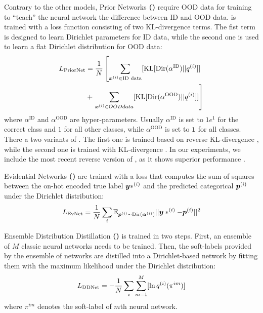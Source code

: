 Contrary to the other models, Prior Networks \textbf{(\PriorNet)} \citep{malini2018, reverse-kl}  require OOD data for training to ``teach'' the neural network the difference between ID and OOD data. \PriorNet is trained with a loss function consisting of two KL-divergence terms. The fist term is designed to learn Dirichlet parameters for ID data, while the second one is used to learn a flat Dirichlet distribution %
for OOD data: 
%
\begin{equation}
\begin{aligned}
    L_{\mathrm{PriorNet}} &= \frac{1}{N} \left[\sum_{{\bm{x}}^{(i)} \in \text{ID data}}  [\mathrm{KL} [\mathrm{Dir} (\alpha^{\mathrm{ID}}) || q^{(i)}]]  \right. \\
                           &+ \left.\sum_{{\bm{x}}^{(i)} \in OOD data} [\mathrm{KL} [\mathrm{Dir} (\alpha^{\mathrm{OOD}}) || q^{(i)}]]\right] \\
\end{aligned}
\end{equation}
%
where $\alpha^{\mathrm{ID}}$ and $\alpha^{\mathrm{OOD}}$ are hyper-parameters. Usually $\alpha^{\mathrm{ID}}$ is set to $1e^{1}$ for the correct class and $1$ for all other classes, while $\alpha^{\mathrm{OOD}}$ is set to $\mathbf{1}$ for all classes.
%
There a two variants of \PriorNet. The first one is trained based on reverse KL-divergence \citep{reverse-kl}, while the second one is trained with KL-divergence \citep{malini2018}. In our experiments, we include the most recent reverse version of \PriorNet, as it shows superior performance \citep{distribution-distillation}. 

Evidential Networks \textbf{(\EvNet)} \citep{sensoy2018} are trained with a loss that computes the sum of squares between the on-hot encoded true label ${\bm{y}}*^{(i)}$ and the predicted categorical ${\bm{p}}^{(i)}$ under the Dirichlet distribution:
%
\begin{equation}
\begin{aligned}
    L_{\mathrm{EvNet}} &= \frac{1}{N} \sum_i \mathbb{E}_{{\bm{p}}^{(i)} \sim \text{Dir}(\bm{\alpha}^{(i)})}||{\bm{y}}*^{(i)} - {\bm{p}}^{(i)}||^2 \\
\end{aligned}
\end{equation}

Ensemble Distribution Distillation \textbf{(\DDNet)} \citep{distribution-distillation} is trained in two steps. First, an ensemble of $M$ classic neural networks needs to be trained. 
Then, the soft-labels  provided by the ensemble of networks are distilled into a Dirichlet-based network by fitting them with the maximum likelihood under the Dirichlet distribution: 
\begin{equation}
\begin{aligned}
    L_{\mathrm{DDNet}} &= - \frac{1}{N}  \sum_i \sum_{m=1}^{M} [\ln q^{(i)}(\pi^{im})] \\
\end{aligned}
\end{equation}
where $\pi^{im}$ denotes the soft-label of $m$th neural network. 


